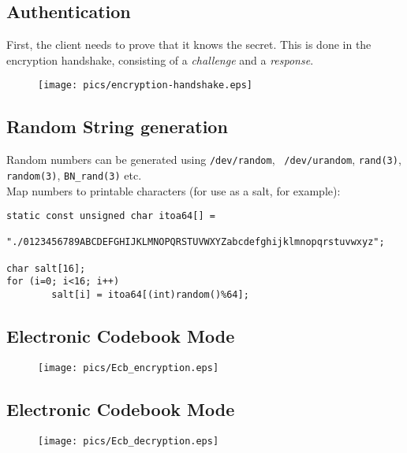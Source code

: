 \documentclass[xga]{xdvislides}
\begin{document}
\subsection{Authentication}
First, the client needs to prove that it knows the secret.  This is done in
the encryption handshake, consisting of a {\em challenge} and a {\em
response}.
\vspace{.125in}
\begin{figure}[hb]
    \begin{center}
        \texttt{[image: pics/encryption-handshake.eps]} \\
    \end{center}
\end{figure}

\subsection{Random String generation}
Random numbers can be generated using {\tt /dev/random}, {\tt
/dev/urandom}, {\tt rand(3)}, {\tt random(3)}, {\tt BN\_rand(3)} etc.
\\

Map numbers to printable characters (for use as a salt, for example):

\begin{verbatim}
static const unsigned char itoa64[] =
        "./0123456789ABCDEFGHIJKLMNOPQRSTUVWXYZabcdefghijklmnopqrstuvwxyz";

char salt[16];
for (i=0; i<16; i++)
        salt[i] = itoa64[(int)random()%64];

\end{verbatim}

\subsection{Electronic Codebook Mode}
\begin{figure}[hb]
    \begin{center}
        \texttt{[image: pics/Ecb\_encryption.eps]} \\
    \end{center}
\end{figure}

\subsection{Electronic Codebook Mode}
\begin{figure}[hb]
    \begin{center}
        \texttt{[image: pics/Ecb\_decryption.eps]} \\
    \end{center}
\end{figure}
\end{document}
